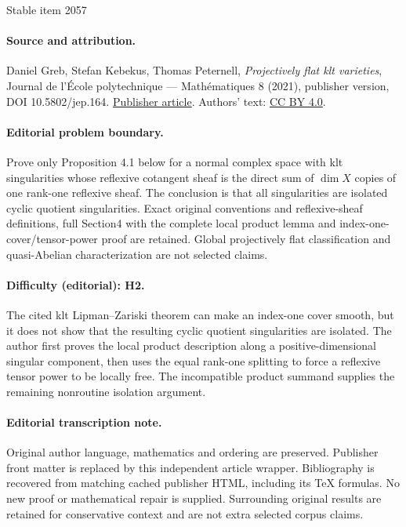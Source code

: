 \documentclass[11pt]{article}
\theoremstyle{plain}
\theoremstyle{definition}
\numberwithin{equation}{thm}
\numberwithin{enumi}{thm}
\begin{document}
\begin{center}{\Large Stable item 2057}\end{center}
\paragraph{Source and attribution.}
Daniel Greb, Stefan Kebekus, Thomas Peternell, \emph{Projectively flat klt varieties}, Journal de l’École polytechnique — Mathématiques 8 (2021), publisher version, DOI 10.5802/jep.164. \href{https://jep.centre-mersenne.org/articles/10.5802/jep.164/}{Publisher article}. Authors' text: \href{https://creativecommons.org/licenses/by/4.0/}{CC BY 4.0}.
\paragraph{Editorial problem boundary.}
Prove only Proposition 4.1 below for a normal complex space with klt singularities whose reflexive cotangent sheaf is the direct sum of \(\dim X\) copies of one rank-one reflexive sheaf. The conclusion is that all singularities are isolated cyclic quotient singularities. Exact original conventions and reflexive-sheaf definitions, full Section4 with the complete local product lemma and index-one-cover/tensor-power proof are retained. Global projectively flat classification and quasi-Abelian characterization are not selected claims.
\paragraph{Difficulty (editorial): H2.}
The cited klt Lipman--Zariski theorem can make an index-one cover smooth, but it does not show that the resulting cyclic quotient singularities are isolated. The author first proves the local product description along a positive-dimensional singular component, then uses the equal rank-one splitting to force a reflexive tensor power to be locally free. The incompatible product summand supplies the remaining nonroutine isolation argument.
\paragraph{Editorial transcription note.}
Original author language, mathematics and ordering are preserved. Publisher front matter is replaced by this independent article wrapper. Bibliography is recovered from matching cached publisher HTML, including its TeX formulas. No new proof or mathematical repair is supplied. Surrounding original results are retained for conservative context and are not extra selected corpus claims.
\clearpage
\setcounter{section}{1}
\end{document}
